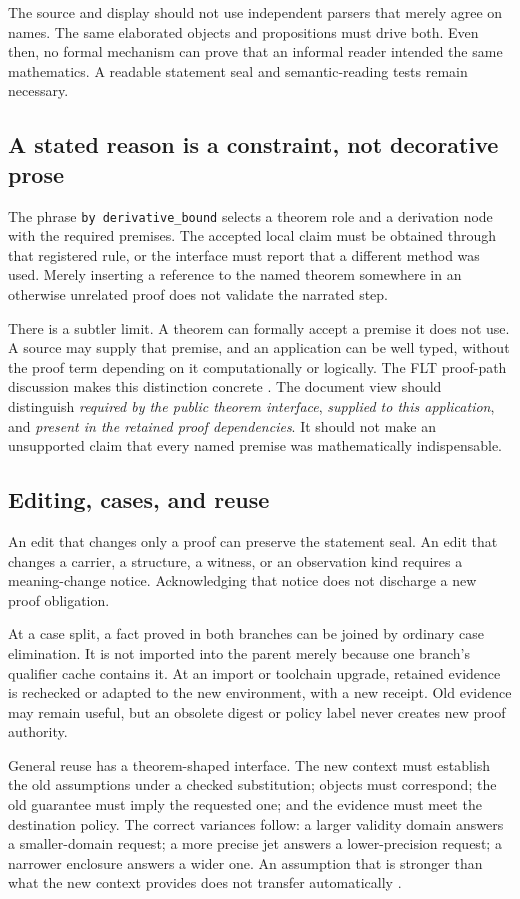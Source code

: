 \documentclass[11pt,a4paper]{article}
\theoremstyle{definition}
\theoremstyle{remark}
\newcommand{\code}[1]{\texttt{#1}}
\begin{document}
The source and display should not use independent parsers that merely agree on names. The same elaborated objects and propositions must drive both. Even then, no formal mechanism can prove that an informal reader intended the same mathematics. A readable statement seal and semantic-reading tests remain necessary.

\subsection{A stated reason is a constraint, not decorative prose}
The phrase \code{by derivative\_bound} selects a theorem role and a derivation node with the required premises. The accepted local claim must be obtained through that registered rule, or the interface must report that a different method was used. Merely inserting a reference to the named theorem somewhere in an otherwise unrelated proof does not validate the narrated step.

There is a subtler limit. A theorem can formally accept a premise it does not use. A source may supply that premise, and an application can be well typed, without the proof term depending on it computationally or logically. The FLT proof-path discussion makes this distinction concrete \cite{fltPath}. The document view should distinguish \emph{required by the public theorem interface}, \emph{supplied to this application}, and \emph{present in the retained proof dependencies}. It should not make an unsupported claim that every named premise was mathematically indispensable.

\subsection{Editing, cases, and reuse}
An edit that changes only a proof can preserve the statement seal. An edit that changes a carrier, a structure, a witness, or an observation kind requires a meaning-change notice. Acknowledging that notice does not discharge a new proof obligation.

At a case split, a fact proved in both branches can be joined by ordinary case elimination. It is not imported into the parent merely because one branch's qualifier cache contains it. At an import or toolchain upgrade, retained evidence is rechecked or adapted to the new environment, with a new receipt. Old evidence may remain useful, but an obsolete digest or policy label never creates new proof authority.

General reuse has a theorem-shaped interface. The new context must establish the old assumptions under a checked substitution; objects must correspond; the old guarantee must imply the requested one; and the evidence must meet the destination policy. The correct variances follow: a larger validity domain answers a smaller-domain request; a more precise jet answers a lower-precision request; a narrower enclosure answers a wider one. An assumption that is stronger than what the new context provides does not transfer automatically \cite{synA,synB}.
\end{document}
